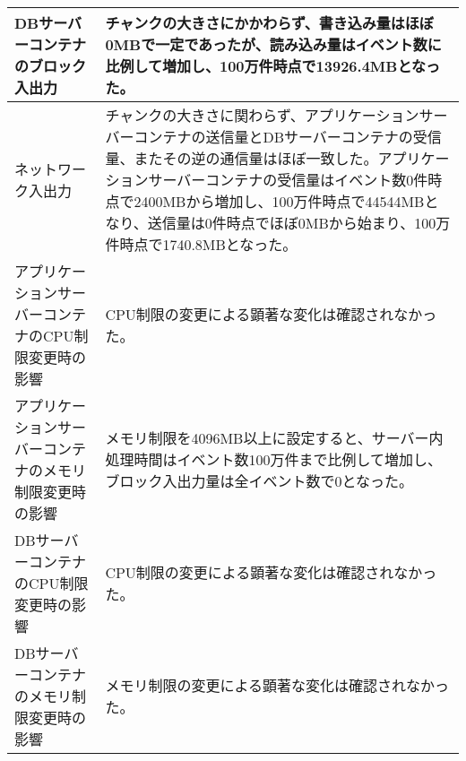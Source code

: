 \documentclass[../../../main]{subfiles}
\begin{document}
\begin{table}[H]
\begin{tabular}{|p{4cm}|p{10cm}|}
            DBサーバーコンテナのブロック入出力           & チャンクの大きさにかかわらず、書き込み量はほぼ0MBで一定であったが、読み込み量はイベント数に比例して増加し、100万件時点で13926.4MBとなった。                                                                                              \\ \hline
            ネットワーク入出力                    & チャンクの大きさに関わらず、アプリケーションサーバーコンテナの送信量とDBサーバーコンテナの受信量、またその逆の通信量はほぼ一致した。アプリケーションサーバーコンテナの受信量はイベント数0件時点で2400MBから増加し、100万件時点で44544MBとなり、送信量は0件時点でほぼ0MBから始まり、100万件時点で1740.8MBとなった。 \\ \hline
            アプリケーションサーバーコンテナのCPU制限変更時の影響 & CPU制限の変更による顕著な変化は確認されなかった。                                                                                                                                                 \\ \hline
            アプリケーションサーバーコンテナのメモリ制限変更時の影響 & メモリ制限を4096MB以上に設定すると、サーバー内処理時間はイベント数100万件まで比例して増加し、ブロック入出力量は全イベント数で0となった。                                                                                                  \\ \hline
            DBサーバーコンテナのCPU制限変更時の影響       & CPU制限の変更による顕著な変化は確認されなかった。                                                                                                                                                 \\ \hline
            DBサーバーコンテナのメモリ制限変更時の影響       & メモリ制限の変更による顕著な変化は確認されなかった。                                                                                                                                                 \\ \hline
        \end{tabular}
    \end{table}
\end{document}
